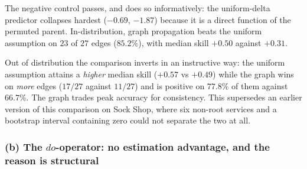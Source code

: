 \documentclass[journal, 10pt]{IEEEtran}
\begin{document}
\begin{table}[!t]
\centering
\caption{RQ4a: graph propagation versus uniform-delta, Alibaba v2021, 27 Tier-1
edges. Skill is relative to a constant predictor.}
\label{tab:rq5-graph}
\end{table}

The negative control passes, and does so informatively: the uniform-delta
predictor collapses hardest ($-0.69$, $-1.87$) because it is a direct function of
the permuted parent. In-distribution, graph propagation beats the uniform
assumption on $23$ of $27$ edges ($85.2\%$), with median skill $+0.50$ against
$+0.31$.

Out of distribution the comparison inverts in an instructive way: the uniform
assumption attains a \emph{higher} median skill ($+0.57$ vs $+0.49$) while the
graph wins on \emph{more} edges ($17/27$ against $11/27$) and is positive on
$77.8\%$ of them against $66.7\%$. The graph trades peak accuracy for
consistency. This supersedes an earlier version of this comparison on Sock Shop,
where six non-root services and a bootstrap interval containing zero could not
separate the two at all.

\subsubsection{(b) The $do$-operator: no estimation advantage, and the reason is structural}
\label{sec:rq5-do}
\end{document}
